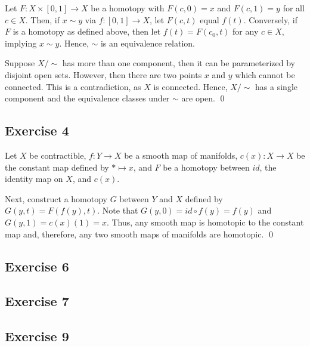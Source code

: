 \documentclass{article}
\begin{document}
    Let $F\colon X\times[0,1]\to X$ be a homotopy with $F(c,0)=x$ and $F(c,1)=y$
    for all $c\in X$. Then, if $x\sim y$ via $f\colon[0,1]\to X$, let $F(c,t)$
    equal $f(t)$. Conversely, if $F$ is a homotopy as defined above, then let
    $f(t)=F(c_0,t)$ for any $c\in X$, implying $x\sim y$. Hence, $\sim$ is an
    equivalence relation.

    Suppose $X/{\sim}$ has more than one component, then it can be parameterized
    by disjoint open sets. However, then there are two points $x$ and $y$ which
    cannot be connected. This is a contradiction, as $X$ is connected. Hence,
    $X/{\sim}$ has a single component and the equivalence classes under $\sim$
    are open.
    \qed

  \subsection*{Exercise 4}
    Let $X$ be contractible, $f\colon Y\to X$ be a smooth map of manifolds,
    $c(x)\colon X\to X$ be the constant map defined by $*\mapsto x$, and $F$ be
    a homotopy between $id$, the identity map on $X$, and $c(x)$.

    Next, construct a homotopy $G$ between $Y$ and $X$ defined by
    $G(y,t)=F(f(y),t)$. Note that $G(y,0)=id\circ f(y)=f(y)$ and $G(y,1)=
    c(x)(1)=x$. Thus, any smooth map is homotopic to the constant map and,
    therefore, any two smooth maps of manifolds are homotopic.
    \qed

  \subsection*{Exercise 6}

  \subsection*{Exercise 7}

  \subsection*{Exercise 9}
\end{document}
